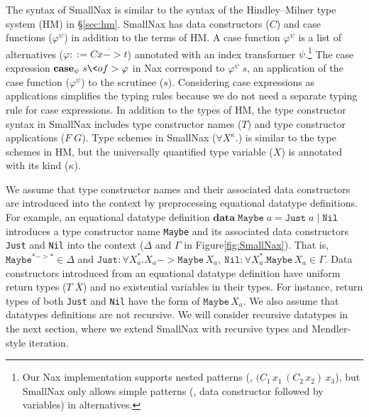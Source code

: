 The syntax of SmallNax is similar to the syntax of 
the Hindley--Milner type system (HM) in \S\ref{sec:hm}.
SmallNax has data constructors ($C$) and case functions ($\varphi^\psi$)
in addition to the terms of HM. A case function $\varphi^\psi$ is
a list of alternatives ($\varphi ::= \overline{C \overline{x} -> t}$)
annotated with an index transformer $\psi$.\footnote{Our Nax implementation
	supports nested patterns (\eg, $(C_1\,x_1\,(C_2\,x_2)\,x_3$), but
	SmallNax only allows simple patterns (\ie, data constructor
	followed by variables) in alternatives.}
The case expression $\textbf{case}_\psi\;s\<of> \varphi$ in Nax
correspond to $\varphi^\psi\;s$, an application of the case function
($\varphi^\psi$) to the scrutinee ($s$). Considering case expressions as
applications simplifies the typing rules because we do not need
a separate typing rule for case expressions. In addition to the types of HM,
the type constructor syntax in SmallNax includes type constructor names ($T$)
and type constructor applications ($F\;G$). Type schemes in SmallNax 
($\forall X^\kappa.$) is similar to the type schemes in HM, but
the universally quantified type variable ($X$) is annotated with
its kind ($\kappa$).

We assume that type constructor names and their associated data constructors are
introduced into the context by preprocessing equational datatype definitions.
For example, an equational datatype definition
$\textbf{data}\;\texttt{Maybe}\;a = \texttt{Just}\;a \mid \texttt{Nil}$
introduces a type constructor name \texttt{Maybe} and its associated
data constructors \texttt{Just} and \texttt{Nil} into the context
($\Delta$ and $\Gamma$ in Figure\;\ref{fig:SmallNax}). That is,
$\texttt{Maybe}^{* -> *} \in \Delta$ and
$\texttt{Just}: \forall X_a^{*}.X_a -> \texttt{Maybe}\,X_a,~
 \texttt{Nil} : \forall X_a^{*}.\texttt{Maybe}\,X_a \in \Gamma$.
Data constructors introduced from an equational datatype definition have
uniform return types ($T\;\overline{X}$) and no existential variables
in their types. For instance, return types of both \texttt{Just} and
\texttt{Nil} have the form of $\texttt{Maybe}\,X_a$.
We also assume that datatypes definitions are not recursive.
We will consider recursive datatypes in the next section,
where we extend SmallNax with recursive types and Mendler-style iteration.


